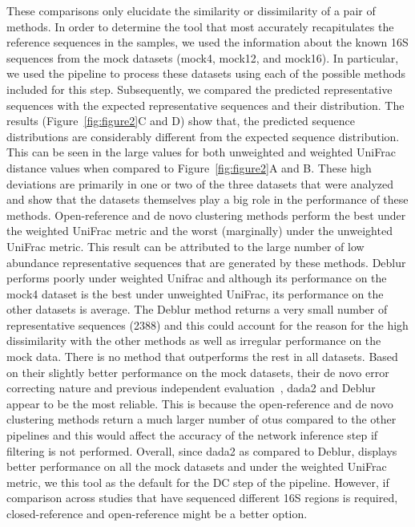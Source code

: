   These comparisons only elucidate the similarity or dissimilarity of a pair of methods.
  In order to determine the tool that most accurately recapitulates the reference sequences in the samples, we used the information about the known 16S sequences from the mock datasets (mock4, mock12, and mock16).
  In particular, we used the pipeline to process these datasets using each of the possible methods included for this step.
  Subsequently, we compared the predicted representative sequences with the expected representative sequences and their distribution.
  The results (Figure~\ref{fig:figure2}C and D) show that, the predicted sequence distributions are considerably different from the expected sequence distribution.
  This can be seen in the large values for both unweighted and weighted UniFrac distance values when compared to Figure~\ref{fig:figure2}A and B.
  These high deviations are primarily in one or two of the three datasets that were analyzed and show that the datasets themselves play a big role in the performance of these methods.
  Open-reference and de novo clustering methods perform the best under the weighted UniFrac metric and the worst (marginally) under the unweighted UniFrac metric.
  This result can be attributed to the large number of low abundance representative sequences that are generated by these methods.
  Deblur performs poorly under weighted Unifrac and although its performance on the mock4 dataset is the best under unweighted UniFrac, its performance on the other datasets is average.
  The Deblur method returns a very small number of representative sequences (2388) and this could account for the reason for the high dissimilarity with the other methods as well as irregular performance on the mock data.
  There is no method that outperforms the rest in all datasets.
  Based on their slightly better performance on the mock datasets, their de novo error correcting nature and previous independent evaluation~\cite{Nearing2018}, \ac{dada2} and Deblur appear to be the most reliable.
  This is because the open-reference and de novo clustering methods return a much larger number of \ac{otu}s compared to the other pipelines and this would affect the accuracy of the network inference step if filtering is not performed.
  Overall, since \ac{dada2} as compared to Deblur, displays better performance on all the mock datasets and under the weighted UniFrac metric, we this tool as the default for the DC step of the pipeline.
  However, if comparison across studies that have sequenced different 16S regions is required, closed-reference and open-reference might be a better option.

